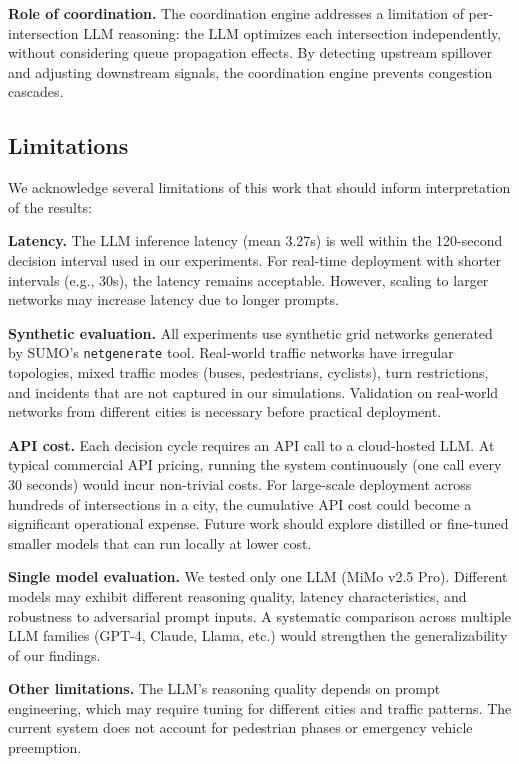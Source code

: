 \documentclass[conference]{IEEEtran}
\begin{document}
\textbf{Role of coordination.} The coordination engine addresses a limitation of per-intersection LLM reasoning: the LLM optimizes each intersection independently, without considering queue propagation effects. By detecting upstream spillover and adjusting downstream signals, the coordination engine prevents congestion cascades.

\subsection{Limitations}
\label{sec:limitations}

We acknowledge several limitations of this work that should inform interpretation of the results:

\textbf{Latency.} The LLM inference latency (mean 3.27s) is well within the 120-second decision interval used in our experiments. For real-time deployment with shorter intervals (e.g., 30s), the latency remains acceptable. However, scaling to larger networks may increase latency due to longer prompts.

\textbf{Synthetic evaluation.} All experiments use synthetic grid networks generated by SUMO's \texttt{netgenerate} tool. Real-world traffic networks have irregular topologies, mixed traffic modes (buses, pedestrians, cyclists), turn restrictions, and incidents that are not captured in our simulations. Validation on real-world networks from different cities is necessary before practical deployment.

\textbf{API cost.} Each decision cycle requires an API call to a cloud-hosted LLM. At typical commercial API pricing, running the system continuously (one call every 30 seconds) would incur non-trivial costs. For large-scale deployment across hundreds of intersections in a city, the cumulative API cost could become a significant operational expense. Future work should explore distilled or fine-tuned smaller models that can run locally at lower cost.

\textbf{Single model evaluation.} We tested only one LLM (MiMo v2.5 Pro). Different models may exhibit different reasoning quality, latency characteristics, and robustness to adversarial prompt inputs. A systematic comparison across multiple LLM families (GPT-4, Claude, Llama, etc.) would strengthen the generalizability of our findings.

\textbf{Other limitations.} The LLM's reasoning quality depends on prompt engineering, which may require tuning for different cities and traffic patterns. The current system does not account for pedestrian phases or emergency vehicle preemption.
\end{document}
